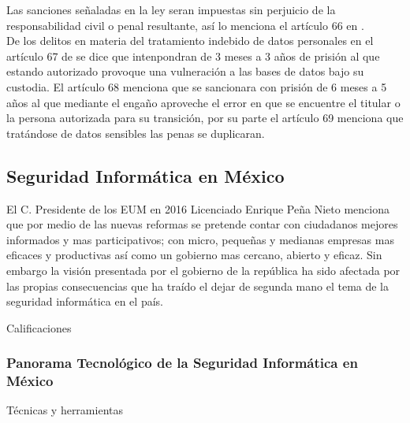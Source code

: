 \documentclass[runningheads,a4paper]{llncs}
\begin{document}
Las sanciones señaladas en la ley seran impuestas sin perjuicio de la responsabilidad civil o penal resultante, así lo menciona el artículo 66 en \cite{LFPDPPP_1}.\\

De los delitos en materia del tratamiento indebido de datos personales en el artículo 67 de \cite{LFPDPPP_1} se dice que intenpondran de 3 meses a 3 años de prisión al que estando autorizado provoque una vulneración a las bases de datos bajo su custodia. El artículo 68 menciona que se sancionara con prisión de 6 meses a 5 años al que mediante el engaño aproveche el error en que se encuentre el titular o la persona autorizada para su transición, por su parte el artículo 69 menciona que tratándose de datos sensibles las penas se duplicaran.

\subsection{Seguridad Informática en México}
El C. Presidente de los \gls{EUM} en 2016 Licenciado Enrique Peña Nieto \cite{EDN_1} menciona que por medio de las nuevas reformas se pretende contar con ciudadanos mejores informados y mas participativos; con micro, pequeñas y medianas empresas mas eficaces y productivas así como un gobierno mas cercano, abierto y eficaz. Sin embargo la visión presentada por el gobierno de la república ha sido afectada por las propias consecuencias que ha traído el dejar de segunda mano el tema de la seguridad informática en el país.

Calificaciones 


\subsubsection{Panorama Tecnológico de la Seguridad Informática en México}
Técnicas y herramientas




\printnoidxglossaries     


\end{document}
